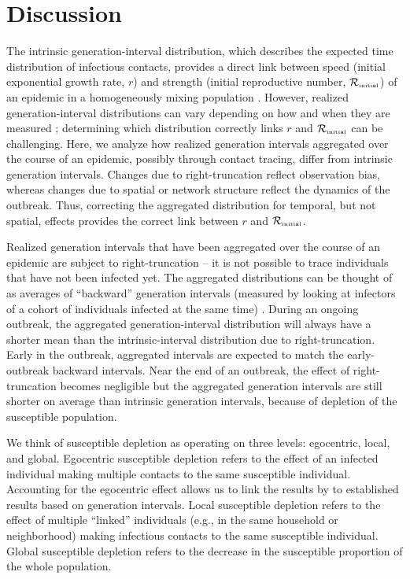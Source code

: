 \documentclass[12pt]{article}
\newcommand{\Rx}[1]{\ensuremath{{\mathcal R}_{#1}}\xspace}
\newcommand{\Rini}{\Rx{\textrm{\tiny initial}}}
\begin{document}
\section{Discussion}

The intrinsic generation-interval distribution, which describes the expected time distribution of infectious contacts, provides a direct link between speed (initial exponential growth rate, $r$) and strength (initial reproductive number, $\Rini$) of an epidemic in a homogeneously mixing population \citep{wallinga2007generation, svensson2007note, svensson2015influence, park2019practical}.
However, realized generation-interval distributions can vary depending on how and when they are measured \citep{nishiura2010time, tomba2010some, champredon2015intrinsic, britton2019estimation};
determining which distribution correctly links $r$ and $\Rini$ can be challenging.
Here, we analyze how realized generation intervals aggregated over the course of an epidemic, possibly through contact tracing, differ from intrinsic generation intervals.
Changes due to right-truncation reflect observation bias, whereas changes due to spatial or network structure reflect the dynamics of the outbreak.
Thus, correcting the aggregated distribution for temporal, but not spatial, effects provides the correct link between $r$ and $\Rini$.

Realized generation intervals that have been aggregated over the course of an epidemic are subject to right-truncation -- it is not possible to trace individuals that have not been infected yet.
The aggregated distributions can be thought of as averages of ``backward'' generation intervals (measured by looking at infectors of a cohort of individuals infected at the same time) \citep{kenah2008generation, nishiura2010time, tomba2010some, champredon2015intrinsic, britton2019estimation}.
During an ongoing outbreak, the aggregated generation-interval distribution will always have a shorter mean than the intrinsic-interval distribution due to right-truncation.
Early in the outbreak, aggregated intervals are expected to match the early-outbreak backward intervals.
Near the end of an outbreak, the effect of right-truncation becomes negligible but the aggregated generation intervals are still shorter on average than intrinsic generation intervals, because of depletion of the susceptible population.

We think of susceptible depletion as operating on three levels: egocentric, local, and global.
Egocentric susceptible depletion refers to the effect of an infected individual making multiple contacts to the same susceptible individual.
Accounting for the egocentric effect allows us to link the results by \cite{trapman2016inferring} to established results based on generation intervals.
Local susceptible depletion refers to the effect of multiple ``linked'' individuals (e.g., in the same household or neighborhood) making infectious contacts to the same susceptible individual.
Global susceptible depletion refers to the decrease in the susceptible proportion of the whole population.
\end{document}
